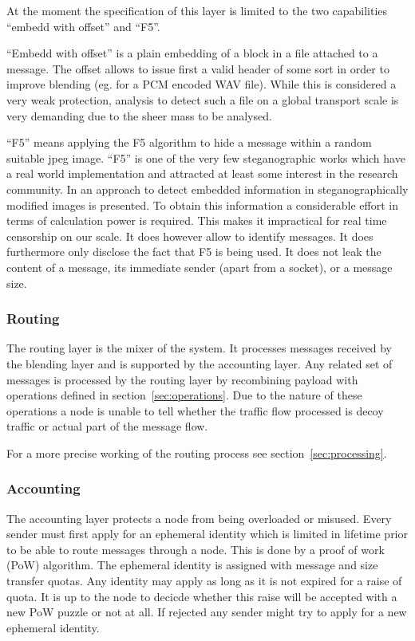\documentclass[9pt,journal,compsoc]{IEEEtran}
\begin{document}
At the moment the specification of this layer is limited to the two capabilities ``embedd with offset'' and ``F5''. 

``Embedd with offset'' is a plain embedding of a block in a file attached to a message. The offset allows to issue first a valid header of some sort in order to improve blending (eg. for a PCM encoded WAV file). While this is considered a very weak protection, analysis to detect such a file on a global transport scale is very demanding due to the sheer mass to be analysed. 

``F5'' means applying the F5 algorithm to hide a message within a random suitable jpeg image. ``F5'' is one of the very few steganographic works which have a real world implementation and attracted at least some interest in the research community. In \cite{steganalysisf5} an approach to detect embedded information in steganographically modified images is presented. To obtain this information a considerable effort in terms of calculation power is required. This makes it impractical for real time censorship on our scale. It does however allow to identify messages. It does furthermore only disclose the fact that F5 is being used. It does not leak the content of a message, its immediate sender (apart from a socket), or a message size.

\subsubsection{Routing}
The routing layer is the mixer of the system. It processes messages received by the blending layer and is supported by the accounting layer. Any related set of messages is processed by the routing layer by recombining payload with operations defined in section~\ref{sec:operations}. Due to the nature of these operations a node is unable to tell whether the traffic flow processed is decoy traffic or actual part of the message flow.

For a more precise working of the routing process see section~\ref{sec:processing}.

\subsubsection{Accounting}
The accounting layer protects a node from being overloaded or misused. Every sender must first apply for an ephemeral identity which is limited in lifetime prior to be able to route messages through a node. This is done by a proof of work (PoW) algorithm. The ephemeral identity is assigned with message and size transfer quotas. Any identity may apply as long as it is not expired for a raise of quota. It is up to the node to decicde whether this raise will be accepted with a new PoW puzzle or not at all. If rejected any sender might try to apply for a new ephemeral identity.
\end{document}
